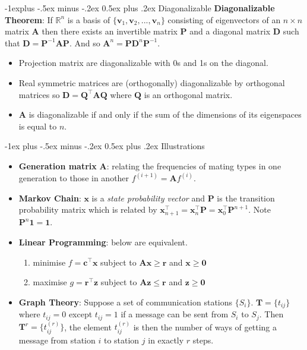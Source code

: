 \documentclass[12pt,landscape, a4paper]{article}
\makeatletter
\newcommand{\bs}[1]{\ensuremath{\boldsymbol{#1}}}
\newcommand{\tp}{{\!\scriptscriptstyle \top}}
\renewcommand{\section}{\@startsection{section}{1}{0mm}%
                                {-1ex plus -.5ex minus -.2ex}%
                                {0.5ex plus .2ex}%
                                {\normalfont\large\bfseries}}
\renewcommand{\subsection}{\@startsection{subsection}{2}{0mm}%
                                {-1explus -.5ex minus -.2ex}%
                                {0.5ex plus .2ex}%
                                {\normalfont\normalsize\bfseries}}
\makeatother
\begin{document}
\begin{multicols}{3}
\subsection{Diagonalizable}
\textbf{Diagonalizable Theorem}: If $\mathbb{R}^n$ is a basis of $\{\bs{v}_1, \bs{v}_2, ..., \bs{v}_n  \}$ consisting of eigenvectors of an $n\times n$ matrix $\bs{A}$ then there exists an invertible matrix $\bs{P}$ and a diagonal matrix $\bs{D}$ such that $\bs{D} = \bs{P}^{-1}\bs{A}\bs{P}$. And so $\bs{A}^n = \bs{P}\bs{D}^{n}\bs{P}^{-1}$.
\begin{itemize}
	\item Projection matrix are diagonalizable with 0s and 1s on the diagonal.
	\item Real symmetric matrices are (orthogonally) diagonalizable by orthogonal matrices so $\bs{D} = \bs{Q}^\tp\bs{A}\bs{Q}$ where $\bs{Q}$ is an orthogonal matrix. 
	\item \bs{A} is diagonalizable if and only if the sum of the dimensions of its eigenspaces is equal to $n$. 
\end{itemize}

\section{Illustrations}
\begin{itemize}
	\item \textbf{Generation matrix} $\bs{A}$: relating the frequencies of mating types in one generation to those in another $f^{(i+1)} = \bs{A}f^{(i)}$.
	\item \textbf{Markov Chain}: $\bs{x}$ is a \emph{state probability vector} and $\bs{P}$ is the transition probability matrix which is related by $\bs{x}_{n+1}^\tp = \bs{x}_n^\tp \bs{P} = \bs{x}_0^\tp \bs{P}^{n+1}$. Note $\bs{P}^n\bs{1} = \bs{1}$.
	\item \textbf{Linear Programming}: below are equivalent.
	\begin{enumerate}
		\item minimise $f=\bs{c}^\tp\bs{x}$ subject to $\bs{A}\bs{x} \geq \bs{r}$ and $\bs{x} \geq \bs{0}$
		\item maximise $g=\bs{r}^\tp\bs{z}$ subject to $\bs{A}\bs{z} \leq \bs{r}$ and $\bs{z} \geq \bs{0}$
	\end{enumerate}
	\item \textbf{Graph Theory}: Suppose a set of communication stations $\{S_i\}$. $\bs{T} = \{t_{ij}\}$ where $t_{ij} = 0$ except $t_{ij}=1$ if a message can be sent from $S_i$ to $S_j$. Then $\bs{T}^r = \{t_{ij}^{(r)}\}$, the element $t_{ij}^{(r)}$ is then the number of ways of getting a message from station $i$ to station $j$ in exactly $r$ steps.  
\end{itemize}


\end{multicols}
\end{document}
